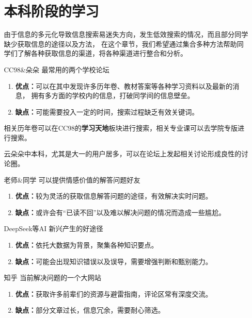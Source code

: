 \section{本科阶段的学习}
由于信息的多元化导致信息搜索易迷失方向，发生低效搜索的情况，而且部分同学缺少获取信息的途径以及方法，
在这个章节，我们希望通过集合多种方法帮助同学们了解各种获取信息的渠道，将各种渠道进行整合和分析。
\begin{jqbox}{CC98\&朵朵}{}
    最常用的两个学校论坛
    \tcblower
    \begin{enumerate}
        \item \textbf{优点：}可以在其中发现许多历年卷、教材答案等各种学习资料以及最新的消息，
        拥有多方面的学校内的信息，打破同学间的信息壁垒。
        \item \textbf{缺点：}可能需要投入一定的时间，搜索过程缺乏有效关键词。
    \end{enumerate}
    相关历年卷可以在CC98的\textbf{学习天地}板块进行搜索，相关专业课可以去学院专版进行搜索。

    云朵朵中本科，尤其是大一的用户居多，可以在论坛上发起相关讨论形成良性的讨论圈。
\end{jqbox}
\begin{jqbox}{老师\&同学}{}
    可以提供情感价值的解答问题好友
    \tcblower
    \begin{enumerate}
        \item \textbf{优点：}较为灵活的获取信息解答问题的途径，有效解决实时问题。
        \item \textbf{缺点：}或许会有“已读不回”以及难以解决问题的情况而造成一些尴尬。
    \end{enumerate}
\end{jqbox}

\begin{jqbox}{DeepSeek等AI}{}
    新兴产生的好途径
    \tcblower
    \begin{enumerate}
        \item \textbf{优点：}依托大数据为背景，聚集各种知识要点。
        \item \textbf{缺点：}可能会出现知识错误以及误导，需要增强判断和甄别能力。
    \end{enumerate}
\end{jqbox}

\begin{jqbox}{知乎}{}
    当前解决问题的一个大网站
    \tcblower
    \begin{enumerate}
        \item \textbf{优点：}获取许多前辈们的资源与避雷指南，评论区常有深度交流。
        \item \textbf{缺点：}部分文章过长，信息冗余，需要耐心筛选。
    \end{enumerate}
\end{jqbox}

